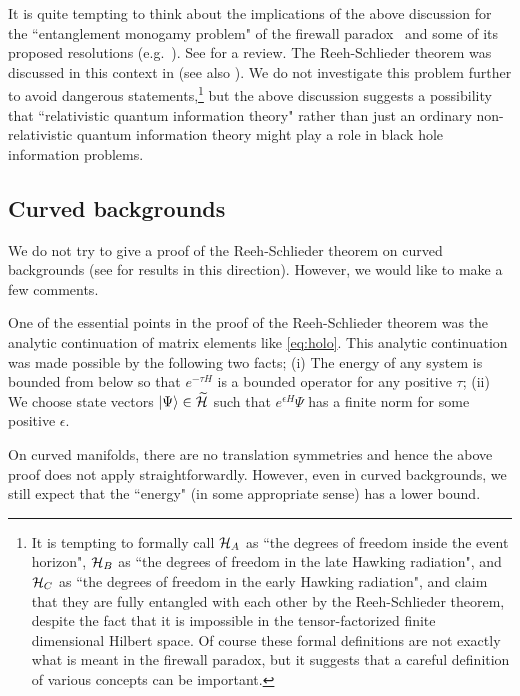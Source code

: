 \documentclass[12pt,a4paper]{article}
\theoremstyle{plain}
\theoremstyle{definition}
\numberwithin{thm}{section}
\newcommand{\ket}[1]{ | {#1} \rangle }
\def\CH{{\cal H}}
\begin{document}
It is quite tempting to think about the implications of the above discussion for the ``entanglement monogamy problem" of the firewall paradox~\cite{Almheiri:2012rt}
and some of its proposed resolutions 
(e.g.~\cite{Papadodimas:2012aq, Maldacena:2013xja, Bousso:2012as, Harlow:2013tf, Papadodimas:2013wnh,Papadodimas:2013jku,Verlinde:2013qya}). 
See \cite{Harlow:2014yka} for a review.
The Reeh-Schlieder theorem was discussed in this context in \cite{Papadodimas:2013jku} (see also \cite{Chakraborty:2017pmn}).
We do not investigate this problem further to avoid dangerous statements,\footnote{It is tempting to formally call
$\CH_A$ as ``the degrees of freedom inside the event horizon", $\CH_B$ as ``the degrees of freedom in the late Hawking radiation", and $\CH_C$ as
``the degrees of freedom in the early Hawking radiation", and claim that they are fully entangled with each other by the Reeh-Schlieder theorem, 
despite the fact that it is impossible in the tensor-factorized finite dimensional Hilbert space. Of course these formal definitions are not exactly what is meant in the firewall paradox, but
it suggests that a careful definition of various concepts can be important. }
but the above discussion suggests a possibility that ``relativistic quantum information theory" rather than just an ordinary non-relativistic quantum information theory might
play a role in black hole information problems. 




\subsection{Curved backgrounds} \label{sec:Curved}
We do not try to give a proof of the Reeh-Schlieder theorem on curved backgrounds (see \cite{Strohmaier:2002mm,Gerard:2017apb,Sanders:2008gs, Morrison:2014jha} for results in this direction).
However, we would like to make a few comments.

One of the essential points in the proof of the Reeh-Schlieder theorem was the analytic continuation of matrix elements like \eqref{eq:holo}.
This analytic continuation was made possible by the following two facts; (i) The energy of any system is bounded from below so that $e^{-\tau H}$ is a bounded operator for 
any positive $\tau$;
(ii) We choose state vectors $\ket{\Psi} \in \widetilde{\CH}$ such that $e^{\epsilon H} \Psi$ has a finite norm for some positive $\epsilon$.

On curved manifolds, there are no translation symmetries and hence the above proof does not apply straightforwardly.
However, even in curved backgrounds, we still expect that the ``energy" (in some appropriate sense) has a lower bound.
\end{document}
